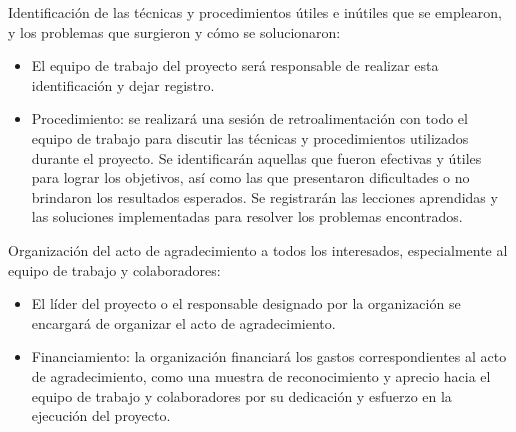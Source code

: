 \documentclass[
11pt, %
codirector, %
]{charter}
\begin{document}
Identificación de las técnicas y procedimientos útiles e inútiles que se emplearon, y los problemas que surgieron y cómo se solucionaron:
    \begin{itemize}  
    \item El equipo de trabajo del proyecto será responsable de realizar esta identificación y dejar registro.
    
    \item Procedimiento: se realizará una sesión de retroalimentación con todo el equipo de trabajo para discutir las técnicas y procedimientos utilizados durante el proyecto. Se identificarán aquellas que fueron efectivas y útiles para lograr los objetivos, así como las que presentaron dificultades o no brindaron los resultados esperados. Se registrarán las lecciones aprendidas y las soluciones implementadas para resolver los problemas encontrados.
    \end{itemize}
Organización del acto de agradecimiento a todos los interesados, especialmente al equipo de trabajo y colaboradores:
\begin{itemize}  
    \item El líder del proyecto o el responsable designado por la organización se encargará de organizar el acto de agradecimiento.
    \item Financiamiento: la organización financiará los gastos correspondientes al acto de agradecimiento, como una muestra de reconocimiento y aprecio hacia el equipo de trabajo y colaboradores por su dedicación y esfuerzo en la ejecución del proyecto.

\end{itemize}
\end{document}
